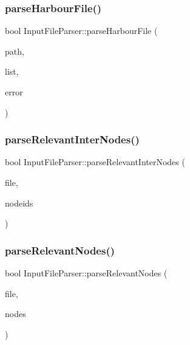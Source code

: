 \mbox{\label{class_input_file_parser_a707a7dab7ad1d7aa3da6f25b2ce41d48}} 
\subsubsection{\texorpdfstring{parseHarbourFile()}{parseHarbourFile()}}
{\footnotesize\ttfamily bool Input\+File\+Parser\+::parse\+Harbour\+File (\begin{DoxyParamCaption}\item[{const Q\+String \&}]{path,  }\item[{Q\+List$<$ std\+::shared\+\_\+ptr$<$ \mbox{\hyperlink{class_harbour_data}{Harbour\+Data}} $>$ $>$ \&}]{list,  }\item[{Q\+String $\ast$}]{error }\end{DoxyParamCaption})}

\mbox{\label{class_input_file_parser_a72c61d399c4a239b2d8a76a5cdfbbc5a}} 
\subsubsection{\texorpdfstring{parseRelevantInterNodes()}{parseRelevantInterNodes()}}
{\footnotesize\ttfamily bool Input\+File\+Parser\+::parse\+Relevant\+Inter\+Nodes (\begin{DoxyParamCaption}\item[{const Q\+String \&}]{file,  }\item[{Q\+Vector$<$ int $>$ \&}]{nodeids }\end{DoxyParamCaption})}

\mbox{\label{class_input_file_parser_aa2be819bdc5012f0c3f1e63d27b2a1bf}} 
\subsubsection{\texorpdfstring{parseRelevantNodes()}{parseRelevantNodes()}}
{\footnotesize\ttfamily bool Input\+File\+Parser\+::parse\+Relevant\+Nodes (\begin{DoxyParamCaption}\item[{const Q\+String \&}]{file,  }\item[{Q\+Set$<$ int $>$ \&}]{nodes }\end{DoxyParamCaption})}

